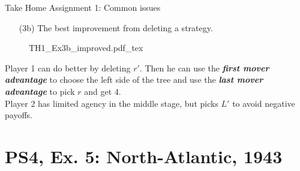 \begin{frame}{Take Home Assignment 1: Common issues}
  \begin{itemize}
    \item[(3b)] The best improvement from deleting a strategy.
  \end{itemize}
  \begin{figure}[!h]
    \begin{center}
    \def\svgwidth{\columnwidth}
    {TH1_Ex3b_improved.pdf_tex}
    \end{center}
  \end{figure}
  Player 1 can do better by deleting $r'$. Then he can use the \textit{\textbf{first mover advantage}} to choose the left side of the tree and use the \textit{\textbf{last mover advantage}} to pick $r$ and get $4$.\\\medskip
  Player 2 has limited agency in the middle stage, but picks $L'$ to avoid negative payoffs.
\end{frame}

\section{PS4, Ex. 5: North-Atlantic, 1943}

